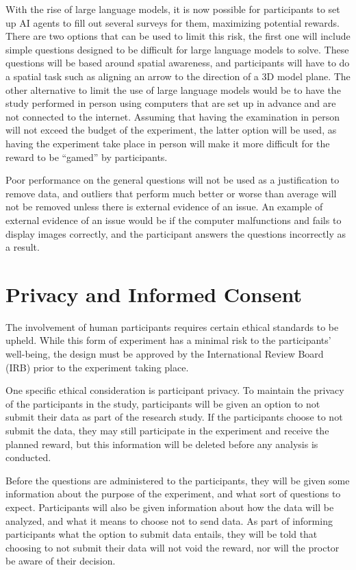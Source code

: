 \documentclass{article}
\begin{document}
With the rise of large language models, it is now possible for participants to set up AI agents to fill out several surveys for them, maximizing potential rewards. There are two options that can be used to limit this risk, the first one will include simple questions designed to be difficult for large language models to solve. These questions will be based around spatial awareness, and participants will have to do a spatial task such as aligning an arrow to the direction of a 3D model plane. The other alternative to limit the use of large language models would be to have the study performed in person using computers that are set up in advance and are not connected to the internet. Assuming that having the examination in person will not exceed the budget of the experiment, the latter option will be used, as having the experiment take place in person will make it more difficult for the reward to be ``gamed'' by participants.

Poor performance on the general questions will not be used as a justification to remove data, and outliers that perform much better or worse than average will not be removed unless there is external evidence of an issue. An example of external evidence of an issue would be if the computer malfunctions and fails to display images correctly, and the participant answers the questions incorrectly as a result. 

\section{Privacy and Informed Consent}
The involvement of human participants requires certain ethical standards to be upheld. While this form of experiment has a minimal risk to the participants' well-being, the design must be approved by the International Review Board (IRB) prior to the experiment taking place.

One specific ethical consideration is participant privacy. To maintain the privacy of the participants in the study, participants will be given an option to not submit their data as part of the research study. If the participants choose to not submit the data, they may still participate in the experiment and receive the planned reward, but this information will be deleted before any analysis is conducted. 

Before the questions are administered to the participants, they will be given some information about the purpose of the experiment, and what sort of questions to expect. Participants will also be given information about how the data will be analyzed, and what it means to choose not to send data. As part of informing participants what the option to submit data entails, they will be told that choosing to not submit their data will not void the reward, nor will the proctor be aware of their decision.
\end{document}
